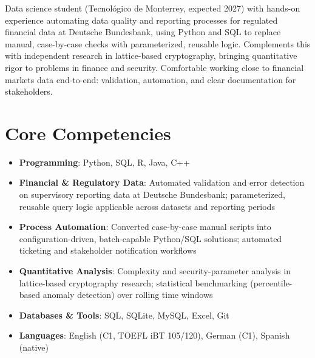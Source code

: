 \documentclass[11pt,a4paper,sans]{moderncv}
\begin{document}
\makecvtitle


\vspace{6pt}
\small{Data science student (Tecnológico de Monterrey, expected 2027) with hands-on experience automating data quality and reporting processes for regulated financial data at Deutsche Bundesbank, using Python and SQL to replace manual, case-by-case checks with parameterized, reusable logic. Complements this with independent research in lattice-based cryptography, bringing quantitative rigor to problems in finance and security. Comfortable working close to financial markets data end-to-end: validation, automation, and clear documentation for stakeholders.}


\section{Core Competencies}
\vspace{1pt}
\begin{itemize}

\item \textbf{Programming}: Python, SQL, R, Java, C++

\item \textbf{Financial \& Regulatory Data}: Automated validation and error detection on supervisory reporting data at Deutsche Bundesbank; parameterized, reusable query logic applicable across datasets and reporting periods

\item \textbf{Process Automation}: Converted case-by-case manual scripts into configuration-driven, batch-capable Python/SQL solutions; automated ticketing and stakeholder notification workflows

\item \textbf{Quantitative Analysis}: Complexity and security-parameter analysis in lattice-based cryptography research; statistical benchmarking (percentile-based anomaly detection) over rolling time windows

\item \textbf{Databases \& Tools}: SQL, SQLite, MySQL, Excel, Git

\item \textbf{Languages}: English (C1, TOEFL iBT 105/120), German (C1), Spanish (native)

\end{itemize}
\end{document}
